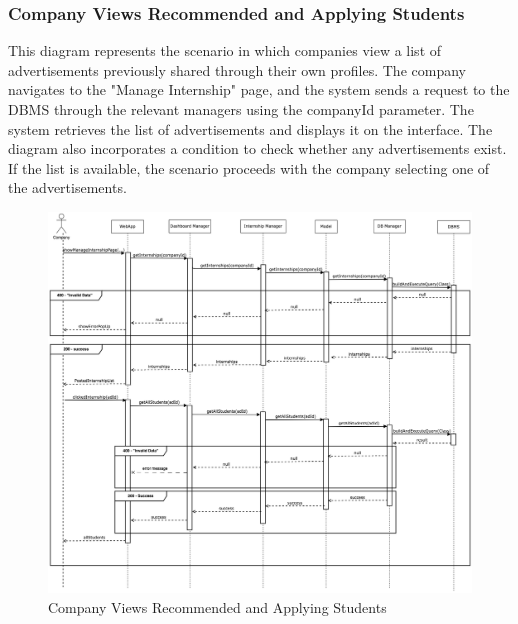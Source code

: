 \documentclass[a4paper,12pt]{article}
\begin{document}
\subsubsection*{Company Views Recommended and Applying Students} 
This diagram represents the scenario in which companies view a list of advertisements previously shared through their own profiles. The company navigates to the "Manage Internship" page, and the system sends a request to the DBMS through the relevant managers using the companyId parameter. The system retrieves the list of advertisements and displays it on the interface. The diagram also incorporates a condition to check whether any advertisements exist. If the list is available, the scenario proceeds with the company selecting one of the advertisements.
\begin{figure}[H]
    \centering
    \includegraphics[scale = 0.25]{DD_figures/RuntimeView/companyViewStudent.drawio.png}
    \caption{Company Views Recommended and Applying Students}
    \centering
\end{figure}

\newpage
\end{document}
